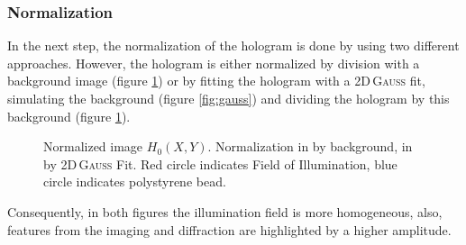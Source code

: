 \documentclass{article}
\begin{document}
\subsubsection{Normalization}
In the next step, the normalization of the hologram is done by using two different approaches. However, the hologram is either normalized by division with a background image (figure \ref{fig:normalized}) or by fitting the hologram with a 2D\,\textsc{Gauss} fit, simulating the background (figure \ref{fig:gauss}) and dividing the hologram by this background (figure \ref{fig:normalized}).
\begin{figure}
    \centering
    \caption{Normalized image $H_0(X,Y)$. Normalization in  by background, in  by 2D\,\textsc{Gauss} Fit. Red circle indicates Field of Illumination, blue circle indicates polystyrene bead.}
    \label{fig:normalized}
\end{figure}
Consequently, in both figures the illumination field is more homogeneous, also, features from the imaging and diffraction are highlighted by a higher amplitude. 
\end{document}
